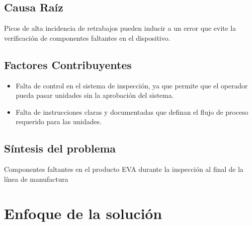 \documentclass[12pt, twoside, letterpaper]{book}
\begin{document}
\subsection{Causa Ra\'iz}
Picos de alta incidencia de retrabajos pueden inducir a un error que evite la verificaci\'on de componentes faltantes en el dispositivo.

\subsection{Factores Contribuyentes}

\begin{itemize}

    \item Falta de control en el sistema de inspecci\'on, ya que permite que el operador pueda pasar unidades sin la aprobaci\'on del sistema.
    
    \item Falta de instrucciones claras y documentadas que definan el flujo de proceso requerido para las unidades.

\end{itemize}

\subsection{S\'intesis del problema}
Componentes faltantes en el producto EVA durante la inspecci\'on al final de la l\'inea de manufactura

\newpage
\section{Enfoque de la soluci\'on}





\end{document}
